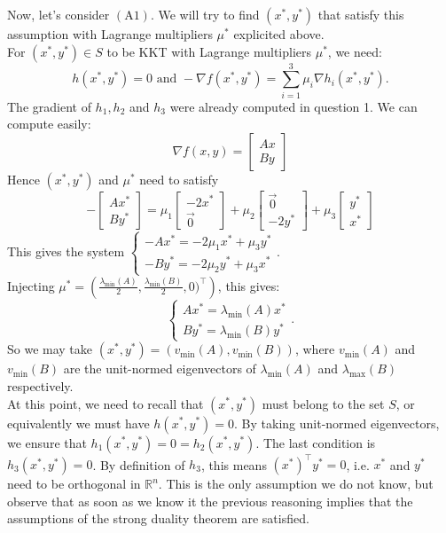 \documentclass{article}
\newcommand{\R}{\mathbb{R}}
\newcommand{\tp}{^\top}
\begin{document}
\noindent Now, let's consider $(\text{A}1)$. We will try to find $(x^*, y^*)$ that satisfy this assumption with Lagrange multipliers $\mu^*$ explicited above.\\ 
\noindent For $ (x^*,y^*)\in S$ to be KKT with Lagrange multipliers $\mu^*$, we need: $$h(x^*,y^*)=0 \text{ and }-\nabla f(x^*,y^*)=\sum_{i=1}^3\mu_i\nabla h_i (x^*,y^*).$$
The gradient of $h_1,h_2$ and $h_3$ were already computed in question 1. We can compute easily:
$$\nabla f(x,y) =\begin{bmatrix}
Ax \\ By
\end{bmatrix}$$
Hence $(x^*,y^*)$ and $\mu^*$ need to satisfy
$$-\begin{bmatrix}Ax^* \\ By^*\end{bmatrix}
= \mu_1 \begin{bmatrix} -2x^*\\ \vec 0 \end{bmatrix} + \mu_2 \begin{bmatrix} \vec 0\\ -2y^* \end{bmatrix}+\mu_3 \begin{bmatrix} y^*\\ x^* \end{bmatrix}
$$
This gives the system $\begin{cases} -Ax^* = -2\mu_1 x^* +\mu_3 y^* \\
-By^* = -2\mu_2 y^* +\mu_3 x^*\end{cases}.$ \\
Injecting $\mu^* = \left( \frac{\lambda_{\min} (A)}{2}, \frac{\lambda_{\min} (B)}{2}, 0)\tp\right)$, this gives:
$$\begin{cases} Ax^* = \lambda_{\min}(A) x^* \\
By^* = \lambda_{\min}(B) y^* \end{cases}.$$
So we may take $(x^*,  y^*) = (v_{\min }(A), v_{\min} (B))$, where $v_{\min }(A)$ and $v_{\min }(B)$ are the unit-normed eigenvectors of $\lambda_{\min}(A)$ and $\lambda_{\max}(B)$ respectively. \\
At this point, we need to recall that $(x^*,y^*)$ must belong to the set $S$, or equivalently we must have $h(x^*,y^*)=0$. By taking unit-normed eigenvectors, we ensure that $h_1(x^*,y^*)=0=h_2(x^*,y^*)$. The last condition is $h_3(x^*,y^*) = 0$. By definition of $h_3$, this means $(x^*)\tp y^* = 0$, i.e. $x^*$ and $y^*$ need to be orthogonal in $\R^n$. This is the only assumption we do not know, but observe that as soon as we know it the previous reasoning implies that the assumptions of the strong duality theorem are satisfied.\\
\end{document}

